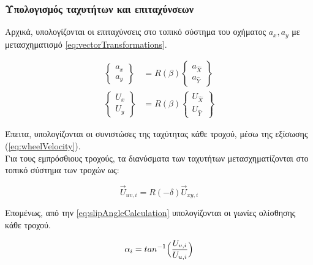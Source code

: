 \subsubsection{Υπολογισμός ταχυτήτων και επιταχύνσεων}

\noindent
Αρχικά, υπολογίζονται οι επιταχύνσεις στο τοπικό σύστημα του οχήματος $a_x, a_y$ με μετασχηματισμό \ref{eq:vectorTransformations}.

\begin{equation}
    \begin{aligned}
         \begin{Bmatrix}
            a_x \\ a_y
        \end{Bmatrix}
        &= R(\beta)
        \begin{Bmatrix}
            a_{\hat{X}} \\ a_{\hat{Y}}
        \end{Bmatrix}\\[10pt]
         \begin{Bmatrix}
            U_x \\ U_y
        \end{Bmatrix}
        &= R(\beta)
        \begin{Bmatrix}
            U_{\hat{X}} \\ U_{\hat{Y}}
        \end{Bmatrix}
    \end{aligned}
    \label{eq:localAccelAndVelocity}
\end{equation}

\noindent
Έπειτα, υπολογίζονται οι συνιστώσες της ταχύτητας κάθε τροχού, μέσω της εξίσωσης (\ref{eq:wheelVelocity}).\\[5pt]

\noindent
Για τους εμπρόσθιους τροχούς, τα διανύσματα των ταχυτήτων μετασχηματίζονται στο τοπικό σύστημα των τροχών ως:

\begin{equation}
    \vec{U}_{uv,i} = R(-\delta)\vec{U}_{xy,i}
    \label{eq:wheelVelocityTransformation}
\end{equation}

 \noindent
 Επομένως, από την \cref{eq:slipAngleCalculation} υπολογίζονται οι γωνίες ολίσθησης κάθε τροχού.

\begin{equation}
    \alpha_i = tan^{-1}\Bigl(\dfrac{U_{v,i}}{U_{u,i}}\Bigr)
    \label{eq:slipAngleCalculation}
\end{equation}

